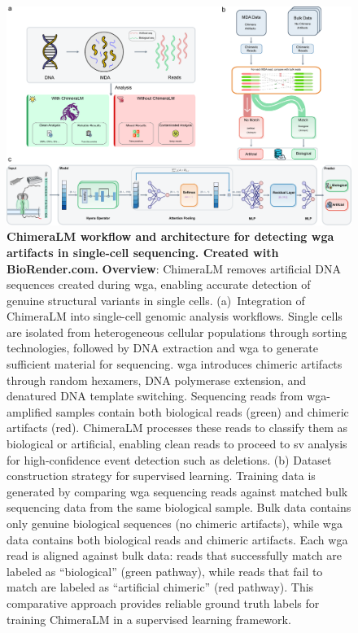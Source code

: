 \documentclass[pdflatex,sn-nature]{sn-jnl}%
\theoremstyle{thmstyleone}%
\theoremstyle{thmstyletwo}%
\theoremstyle{thmstylethree}%
\begin{document}
\begin{figure}[!ht]
	\begin{center}
		\includegraphics[width=\textwidth]{final_figures/figure1}
	\end{center}
	\caption{{\bf ChimeraLM workflow and architecture for detecting \gls{wga} artifacts in single-cell sequencing. Created with BioRender.com.}
			{\bf Overview}: ChimeraLM removes artificial DNA sequences created during \gls{wga}, enabling accurate detection of genuine structural variants in single cells.
		(a)~Integration of ChimeraLM into single-cell genomic analysis workflows. Single cells are isolated from heterogeneous cellular populations through sorting technologies, followed by DNA extraction and \gls{wga} to generate sufficient material for sequencing. \gls{wga} introduces chimeric artifacts through random hexamers, DNA polymerase extension, and denatured DNA template switching. Sequencing reads from \gls{wga}-amplified samples contain both biological reads (green) and chimeric artifacts (red). ChimeraLM processes these reads to classify them as biological or artificial, enabling clean reads to proceed to \gls{sv} analysis for high-confidence event detection such as deletions.
		(b) Dataset construction strategy for supervised learning. Training data is generated by comparing \gls{wga} sequencing reads against matched bulk sequencing data from the same biological sample. Bulk data contains only genuine biological sequences (no chimeric artifacts), while \gls{wga} data contains both biological reads and chimeric artifacts. Each \gls{wga} read is aligned against bulk data: reads that successfully match are labeled as ``biological'' (green pathway), while reads that fail to match are labeled as ``artificial chimeric'' (red pathway). This comparative approach provides reliable ground truth labels for training ChimeraLM in a supervised learning framework.
}
\end{figure}
\end{document}
